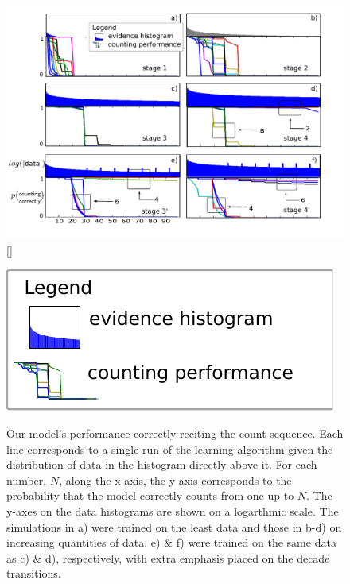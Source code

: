 \documentclass[10pt,letterpaper]{article}
\begin{document}
\begin{figure}[t]
  \includegraphics[width=\linewidth]{figures/counting_grid2}
  [\FBwidth]
           {\caption{Our model's performance correctly reciting the
               count sequence. Each line corresponds to a single run
               of the learning algorithm given the distribution of
               data in the histogram directly above it. For each
               number, $N$, along the x-axis, the y-axis corresponds
               to the probability that the model correctly counts from
               one up to $N$. The y-axes on the data histograms are
               shown on a logarthmic scale. The simulations in a) were
               trained on the least data and those in b-d) on
               increasing quantities of data. e) \& f) were trained on
               the same data as c) \& d), respectively, with extra
               emphasis placed on the decade
               transitions.}\label{fig:counting_grid}}
           {\includegraphics[width=.2\textwidth]{figures/legend.pdf}}
\end{figure}
\end{document}
